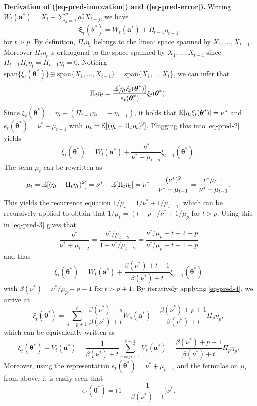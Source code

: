 \textbf{Derivation of (\ref{eq-pred-innovation}) and (\ref{eq-pred-error}).} Writing $W_t(\boldsymbol{a}^*) = X_t - \sum_{j=1}^p a_j^* X_{t-j}$, we have
\begin{equation}\label{eq-pred-1}
\boldsymbol{\xi}_t(\theta^*) = W_t(\boldsymbol{a}^*) + \Pi_{t-1} \eta_{t-1} 
\end{equation}
for $t > p$. By definition, $\Pi_t \eta_t$ belongs to the linear space spanned by $X_1,\ldots,X_{t-1}$. Moreover $\Pi_t \eta_t$ is orthogonal to the space spanned by $X_1,\ldots,X_{t-1}$ since $\Pi_{t-1} \Pi_t \eta_t = \Pi_{t-1} \eta_t = 0$. Noticing $\text{span}\{\xi_t(\boldsymbol{\theta}^*)\} \oplus \text{span}\{X_1,\ldots,X_{t-1}\} = \text{span}\{X_1,\ldots,X_t\}$, we can infer that 
\begin{equation}\label{eq-pred-2}
\Pi_t \eta_t = \frac{\mathbb{E}[\eta_t \xi_t(\boldsymbol{\theta}^*)]}{e_t(\boldsymbol{\theta}^*)} \xi_t(\boldsymbol{\theta}^*). 
\end{equation}
Since $\xi_t(\boldsymbol{\theta}^*) = \eta_t + (\Pi_{t-1} \eta_{t-1} - \eta_{t-1})$, it holds that $\mathbb{E}[\eta_t \xi_t(\boldsymbol{\theta}^*)] = \nu^*$ and $e_t(\boldsymbol{\theta}^*) = \nu^* + \mu_{t-1}$ with $\mu_t = \mathbb{E}[(\eta_t - \Pi_t \eta_t)^2]$. Plugging this into \eqref{eq-pred-2} yields 
\begin{equation}\label{eq-pred-3}
\xi_t(\boldsymbol{\theta}^*) = W_t(\boldsymbol{a}^*) + \frac{\nu^*}{\nu^* + \mu_{t-2}} \xi_{t-1}(\boldsymbol{\theta}^*). 
\end{equation}
The term $\mu_t$ can be rewritten as 
\[ \mu_t = \mathbb{E}[(\eta_t - \Pi_t \eta_t)^2] = \nu^* - \mathbb{E}[\Pi_t\eta_t] = \nu^* - \frac{(\nu^*)^2}{\nu^* + \mu_{t-1}} = \frac{\nu^* \mu_{t-1}}{\nu^* + \mu_{t-1}}. \] 
This yields the recurrence equation $1/\mu_t = 1/\nu^* + 1/\mu_{t-1}$, which can be recursively applied to obtain that $1/\mu_t = (t-p)/\nu^* + 1/\mu_p$ for $t > p$. Using this in \eqref{eq-pred-3} gives that 
\[ \frac{\nu^*}{\nu^* + \mu_{t-2}} = \frac{\nu^*/\mu_{t-2}}{1 + \nu^*/\mu_{t-2}} =  \frac{\nu^*/\mu_p + t - 2 - p}{\nu^*/\mu_p + t - 1 - p} \]
and thus
\begin{equation}\label{eq-pred-4}
\xi_t(\boldsymbol{\theta}^*) = W_t(\boldsymbol{a}^*) + \frac{\beta(\nu^*) + t - 1}{\beta(\nu^*) + t} \xi_{t-1}(\boldsymbol{\theta}^*) 
\end{equation}
with $\beta(\nu^*) = \nu^*/\mu_p - p - 1$ for $t > p+1$. By iteratively applying \eqref{eq-pred-4}, we arrive at 
\[ \xi_t(\boldsymbol{\theta}^*) = \sum\limits_{s=p+1}^t \frac{\beta(\nu^*) + s}{\beta(\nu^*) + t} W_s(\boldsymbol{a}^*) + \frac{\beta(\nu^*) + p + 1}{\beta(\nu^*) + t} \Pi_p \eta_p, \] 
which can be equivalently written as
\[ \xi_t(\boldsymbol{\theta}^*) = V_t(\boldsymbol{a}^*) - \frac{1}{\beta(\nu^*) + t} \sum\limits_{s=p+1}^{t-1} V_s(\boldsymbol{a}^*) + \frac{\beta(\nu^*)+p+1}{\beta(\nu^*) + t} \Pi_p \eta_p. \]
Moreover, using the representation $e_t(\boldsymbol{\theta}^*) = \nu^* + \mu_{t-1}$ and the formulas on $\mu_t$ from above, it is easily seen that 
\[ e_t(\boldsymbol{\theta}^*) = \Big( 1 + \frac{1}{\beta(\nu^*)+t} \Big) \nu^*. \]


